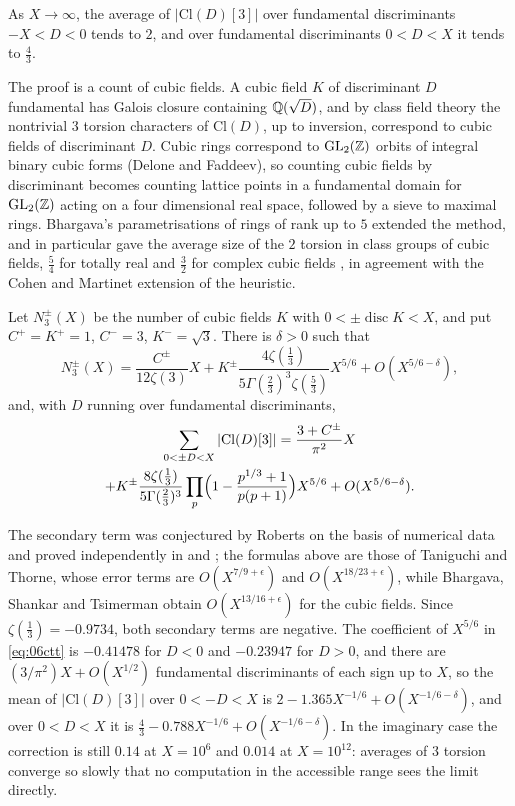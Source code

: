 \begin{theorem}\label{thm:06cdh}
As $X\to\infty$, the average of $|\mathrm{Cl}(D)[3]|$ over fundamental discriminants $-X<D<0$ tends to $2$, and over fundamental discriminants $0<D<X$ it tends to $\frac43$.
\end{theorem}

The proof is a count of cubic fields. A cubic field $K$ of discriminant $D$ fundamental has Galois closure containing $\mathbb{Q}(\sqrt D)$, and by class field theory the nontrivial $3$ torsion characters of $\mathrm{Cl}(D)$, up to inversion, correspond to cubic fields of discriminant $D$. Cubic rings correspond to $\mathrm{GL}_2(\mathbb{Z})$ orbits of integral binary cubic forms (Delone and Faddeev), so counting cubic fields by discriminant becomes counting lattice points in a fundamental domain for $\mathrm{GL}_2(\mathbb{Z})$ acting on a four dimensional real space, followed by a sieve to maximal rings. Bhargava's parametrisations of rings of rank up to $5$ extended the method, and in particular gave the average size of the $2$ torsion in class groups of cubic fields, $\frac54$ for totally real and $\frac32$ for complex cubic fields \cite{bhargava2005}, in agreement with the Cohen and Martinet extension of the heuristic.

\begin{theorem}\label{thm:06csecond}
Let $N_3^\pm(X)$ be the number of cubic fields $K$ with $0<\pm\operatorname{disc}K<X$, and put $C^+ = K^+ = 1$, $C^- = 3$, $K^- = \sqrt3$. There is $\delta>0$ such that
\[
N_3^\pm(X) = \frac{C^\pm}{12\zeta(3)}X + K^\pm\frac{4\zeta(\frac13)}{5\Gamma(\frac23)^3\zeta(\frac53)}X^{5/6} + O(X^{5/6-\delta}),
\]
and, with $D$ running over fundamental discriminants,
\begin{multline}\label{eq:06ctt}
\sum_{0<\pm D<X}|\mathrm{Cl}(D)[3]| = \frac{3+C^\pm}{\pi^2}X\\
+ K^\pm\frac{8\zeta(\frac13)}{5\Gamma(\frac23)^3}\prod_p\Bigl(1-\frac{p^{1/3}+1}{p(p+1)}\Bigr)X^{5/6} + O(X^{5/6-\delta}).
\end{multline}
\end{theorem}

The secondary term was conjectured by Roberts on the basis of numerical data and proved independently in \cite{bst2013} and \cite{taniguchithorne2013}; the formulas above are those of Taniguchi and Thorne, whose error terms are $O(X^{7/9+\epsilon})$ and $O(X^{18/23+\epsilon})$, while Bhargava, Shankar and Tsimerman obtain $O(X^{13/16+\epsilon})$ for the cubic fields. Since $\zeta(\frac13) = -0.9734$, both secondary terms are negative. The coefficient of $X^{5/6}$ in \eqref{eq:06ctt} is $-0.41478$ for $D<0$ and $-0.23947$ for $D>0$, and there are $(3/\pi^2)X+O(X^{1/2})$ fundamental discriminants of each sign up to $X$, so the mean of $|\mathrm{Cl}(D)[3]|$ over $0<-D<X$ is $2-1.365X^{-1/6}+O(X^{-1/6-\delta})$, and over $0<D<X$ it is $\frac43-0.788X^{-1/6}+O(X^{-1/6-\delta})$. In the imaginary case the correction is still $0.14$ at $X = 10^6$ and $0.014$ at $X = 10^{12}$: averages of $3$ torsion converge so slowly that no computation in the accessible range sees the limit directly.

